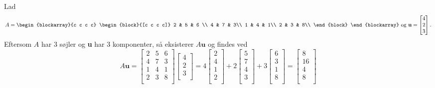 \begin{eks}
\label{Matrix-vektor}
%
Lad
$$A=
\begin{blockarray}{c c c c}
\begin{block}{[c c c c]}
2 & 5 & 6 \\
4 & 7 & 3\\
1 & 4 & 1\\
2 & 3 & 8\\
\end{block}
\end{blockarray}
%
\text{ og }
%
\textbf{u}=
\begin{bmatrix}
4 \\
2 \\
3 \\ 
\end{bmatrix}.
$$
%
Eftersom $A$ har 3 søjler og \textbf{u} har 3 komponenter, så eksisterer $A\textbf{u}$ og findes ved
$$
A\textbf{u}=
\begin{bmatrix}
2 & 5 & 6 \\
4 & 7 & 3\\
1 & 4 & 1\\
2 & 3 & 8\\
\end{bmatrix}
\begin{bmatrix}
4 \\
2 \\
3 \\ 
\end{bmatrix}
=4
\begin{bmatrix}
2\\
4\\
1\\
2\\
\end{bmatrix}
+2
\begin{bmatrix}
5\\
7\\
4\\
3\\
\end{bmatrix}
+3
\begin{bmatrix}
6\\
3\\
1\\
8\\
\end{bmatrix}
=
\begin{bmatrix}
8\\
16\\
4\\
8\\

\end{bmatrix}$$
\end{eks}
